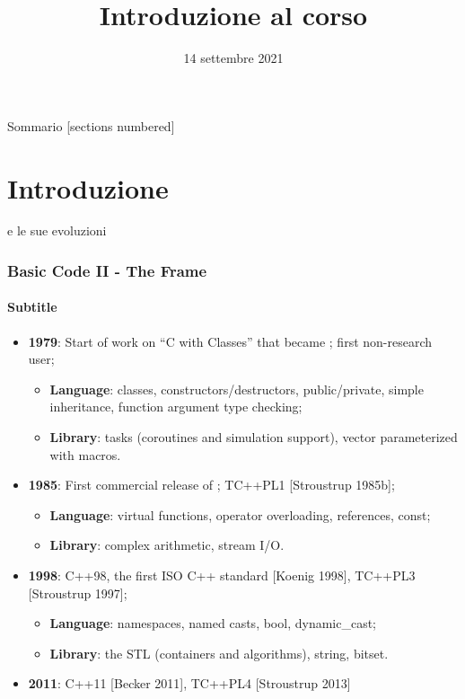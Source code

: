 \documentclass[xcolor={dvipsnames, svgnames, x11names, table}, 10pt]{beamer}
\title{Introduzione al corso}
\date{14 settembre 2021}
\institute{%
    \textbf{Obiettivi di apprendimento}:
    \begin{itemize}
        \item Storia recente del \cplusplus;
        \item Esempi di composizione opzionale.
    \end{itemize}%
}
\begin{document}
\frame{\titlepage}

\begin{frame}{Sommario}
  [sections numbered]
  \tableofcontents%
\end{frame}

\section[Introduzione]{Introduzione}

\begin{frame}[fragile]{\cplusplus e le sue evoluzioni}
\frametitle{Basic Code II - The Frame} %
\framesubtitle{Subtitle} %
    \begin{itemize}[<+- | alert@+>]
        \item \textbf{1979}: Start of work on \enquote{C with Classes} that became \cplusplus; first non-research user;
        \begin{itemize}\footnotesize
            \item \textbf{Language}: classes, constructors/destructors, public/private, simple inheritance, function argument type checking;
            \item \textbf{Library}: tasks (coroutines and simulation support), vector parameterized with macros.
        \end{itemize}
        \item \textbf{1985}: First commercial release of \cplusplus; TC++PL1 [Stroustrup 1985b];
        \begin{itemize}\footnotesize
            \item \textbf{Language}: virtual functions, operator overloading, references, const;
            \item \textbf{Library}: complex arithmetic, stream I/O.
        \end{itemize}
        \item \textbf{1998}: C++98, the first ISO C++ standard [Koenig 1998], TC++PL3 [Stroustrup 1997];
        \begin{itemize}\footnotesize
            \item \textbf{Language}: namespaces, named casts, bool, dynamic\_cast;
            \item \textbf{Library}: the STL (containers and algorithms), string, bitset.
        \end{itemize}
        \framebreak
        \item \textbf{2011}: C++11 [Becker 2011], TC++PL4 [Stroustrup 2013]

\end{itemize}
\end{frame}
\end{document}
